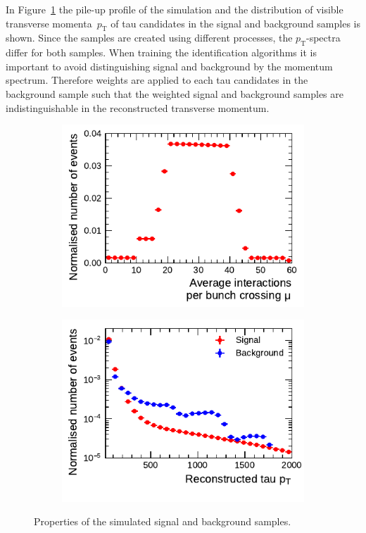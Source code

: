In Figure~\ref{fig:pt_mu} the pile-up profile of the simulation and the
distribution of visible transverse momenta~$p_\text{T}$ of tau candidates in the
signal and background samples is shown. Since the samples are created using
different processes, the $p_\text{T}$-spectra differ for both samples. When
training the identification algorithms it is important to avoid distinguishing
signal and background by the momentum spectrum. Therefore weights are applied to
each tau candidates in the background sample such that the weighted signal and
background samples are indistinguishable in the reconstructed transverse
momentum.

\begin{figure}[htb]
  \centering
  \begin{subfigure}[t]{0.48\textwidth}
    \centering
    \includegraphics{./figures/bdt_perf/pt_mu_samples/mu.pdf}
  \end{subfigure}\hfill
  \begin{subfigure}[t]{0.48\textwidth}
    \centering
    \includegraphics{./figures/bdt_perf/pt_mu_samples/pt.pdf}
  \end{subfigure}
  \caption{Properties of the simulated signal and background samples.}
  \label{fig:pt_mu}
\end{figure}


